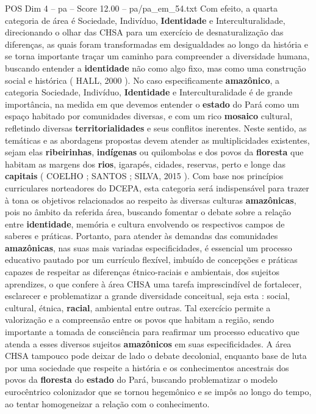 \begin{textsample}{POS Dim 4 – pa – Score 12.00 – pa/pa\_em\_54.txt}  \label{ex:f4_pos_017}
Com efeito, a quarta categoria de área é Sociedade, Indivíduo, \textbf{Identidade} e Interculturalidade, direcionando o olhar das CHSA para um exercício de desnaturalização das diferenças, as quais foram transformadas em desigualdades ao longo da história e se torna importante traçar um caminho para compreender a diversidade humana, buscando entender a \textbf{identidade} não como algo fixo, mas como uma construção social e histórica ( HALL, 2000 ).
No caso especificamente \textbf{amazônico}, a categoria Sociedade, Indivíduo, \textbf{Identidade} e Interculturalidade é de grande importância, na medida em que devemos entender o \textbf{estado} do Pará como um espaço habitado por comunidades diversas, e com um rico \textbf{mosaico} cultural, refletindo diversas \textbf{territorialidades} e seus conflitos inerentes.
Neste sentido, as temáticas e as abordagens propostas devem atender as multiplicidades existentes, sejam elas \textbf{ribeirinhas}, \textbf{indígenas} ou quilombolas e dos povos da \textbf{floresta} que habitam as margens dos \textbf{rios}, igarapés, cidades, reservas, perto e longe das \textbf{capitais} ( COELHO ; SANTOS ; SILVA, 2015 ).
Com base nos princípios curriculares norteadores do DCEPA, esta categoria será indispensável para trazer à tona os objetivos relacionados ao respeito às diversas culturas \textbf{amazônicas}, pois no âmbito da referida área, buscando fomentar o debate sobre a relação entre \textbf{identidade}, memória e cultura envolvendo os respectivos campos de saberes e práticas.
Portanto, para atender às demandas das comunidades \textbf{amazônicas}, nas suas mais variadas especificidades, é essencial um processo educativo pautado por um currículo flexível, imbuído de concepções e práticas capazes de respeitar as diferenças étnico-raciais e ambientais, dos sujeitos aprendizes, o que confere à área CHSA uma tarefa imprescindível de fortalecer, esclarecer e problematizar a grande diversidade conceitual, seja esta : social, cultural, étnica, \textbf{racial}, ambiental entre outras.
Tal exercício permite a valorização e a compreensão entre os povos que habitam a região, sendo importante a tomada de consciência para reafirmar um processo educativo que atenda a esses diversos sujeitos \textbf{amazônicos} em suas especificidades.
A área CHSA tampouco pode deixar de lado o debate decolonial, enquanto base de luta por uma sociedade que respeite a história e os conhecimentos ancestrais dos povos da \textbf{floresta} do \textbf{estado} do Pará, buscando problematizar o modelo eurocêntrico colonizador que se tornou hegemônico e se impôs ao longo do tempo, ao tentar homogeneizar a relação com o conhecimento.

\end{textsample}
